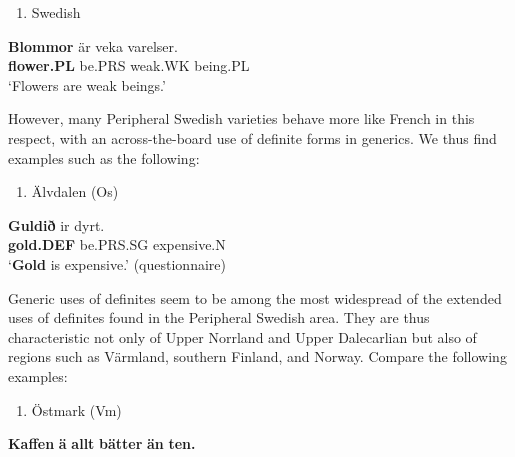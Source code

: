 \begin{enumerate} %
\item 
Swedish

\end{enumerate} %
\ea\label{}
\gll \textbf{Blommor} är  veka  varelser.\\


\textbf{flower.PL} be.PRS  weak.WK  being.PL\\ %


‘Flowers are weak beings.’
\z


However, many Peripheral Swedish varieties behave more like French in this respect, with an across-the-board use of definite forms in generics. We thus find examples such as the following:

\begin{enumerate} %
\item 
Älvdalen (Os)
\end{enumerate} %
\ea\label{}
\gll \textbf{Guld}\textbf{ið} ir  dyrt.  \\


\textbf{gold.DEF} be.PRS.SG  expensive.N  \\ %


‘\textbf{Gold} is expensive.’ (questionnaire)
\z

Generic uses of definites seem to be among the most widespread of the extended uses of definites found in the Peripheral Swedish area. They are thus characteristic not only of Upper Norrland and Upper Dalecarlian but also of regions such as Värmland, southern Finland, and Norway. Compare the following examples:

\begin{enumerate} %
\item 
Östmark (Vm) 

\end{enumerate} %
\ea\label{}
\gll \textbf{Kaffen} \textbf{ä}\textbf{  allt}\textbf{  bätter}\textbf{  än} \textbf{ten.}\\


